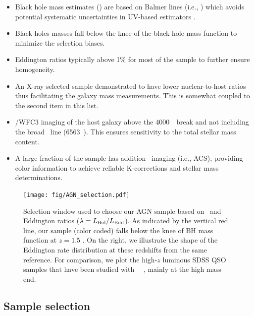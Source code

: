 \documentclass[apj]{emulateapj}
\begin{document}
\begin{itemize}

\item Black hole mass estimates (\mbh) are based on Balmer lines (i.e., \halpha) which avoids potential systematic uncertainties in UV-based estimators \citep{Greene2005}.

\item Black holes masses fall below the knee of the black hole mass function to minimize the selection biases.

\item Eddington ratios typically above 1\% for most of the sample to further ensure homogeneity.

\item An X-ray selected sample demonstrated to have lower nuclear-to-host ratios thus facilitating the galaxy mass measurements. This is somewhat coupled to the second item in this list.

\item \hst/WFC3 imaging of the host galaxy above the 4000~\angstrom\ break and not including the broad \halpha\ line (6563~\angstrom). This ensures sensitivity to the total stellar mass content.

\item A large fraction of the sample has addition \hst\ imaging (i.e., ACS), providing color information to achieve reliable K-corrections and stellar mass determinations. 
\end{itemize}

\begin{figure}
\centering
{
\texttt{[image: fig/AGN\_selection.pdf]}
}
\caption{\label{fig:selection} Selection window used to choose our AGN sample based on  \mbh~and Eddington ratios ($\lambda = L_{\rm Bol}/L_{\rm Edd}$). As indicated by the vertical red line, our sample (color coded) falls below the knee of BH mass function at $z=1.5$ \citep[top panel,][]{Schulze2015}. On the right, we illustrate the shape of the Eddington rate distribution at these redshifts from the same reference. For comparison, we plot the high-$z$ luminous SDSS QSO samples that have been studied with \hst\ ~\citep[grey squares and circles from][respectively]{Peng2006a, Decarli2010}, mainly at the high mass end.}
\end{figure} 

\subsection{Sample selection}\label{sec:target_selection}
\end{document}
